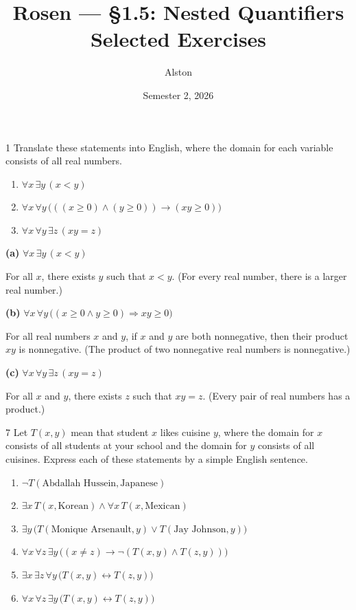 \documentclass[11pt]{article}
\title{Rosen --- \S 1.5: Nested Quantifiers\\ \large Selected Exercises}
\author{Alston}
\date{Semester 2, 2026}
\begin{document}
\maketitle


\begin{exercise}{1}
    Translate these statements into English, where the domain for
    each variable consists of all real numbers.
    \begin{enumerate}[label=(\alph*)]
        \item $\forall x\,\exists y\,(x<y)$
        \item $\forall x\,\forall y\,\big(((x\geq 0)\wedge(y\geq 0))\to(xy\geq 0)\big)$
        \item $\forall x\,\forall y\,\exists z\,(xy=z)$
    \end{enumerate}
\end{exercise}

\begin{solution}
\textbf{(a)} $\forall x\,\exists y\,(x<y)$

For all $x$, there exists $y$ such that $x<y$. (For every real
number, there is a larger real number.)

\bigskip
\noindent\textbf{(b)} $\forall x\,\forall y\,\big((x\geq0\wedge y\geq0)\Rightarrow xy\geq0\big)$

For all real numbers $x$ and $y$, if $x$ and $y$ are both
nonnegative, then their product $xy$ is nonnegative. (The product of
two nonnegative real numbers is nonnegative.)

\bigskip
\noindent\textbf{(c)} $\forall x\,\forall y\,\exists z\,(xy=z)$

For all $x$ and $y$, there exists $z$ such that $xy=z$. (Every pair
of real numbers has a product.)
\end{solution}

\begin{exercise}{7}
    Let $T(x,y)$ mean that student $x$ likes cuisine $y$, where the
    domain for $x$ consists of all students at your school and the
    domain for $y$ consists of all cuisines. Express each of these
    statements by a simple English sentence.
    \begin{enumerate}[label=(\alph*)]
        \item $\neg T(\text{Abdallah Hussein}, \text{Japanese})$
        \item $\exists x\,T(x,\text{Korean})\wedge \forall x\,T(x,\text{Mexican})$
        \item $\exists y\,\big(T(\text{Monique Arsenault}, y)\vee T(\text{Jay Johnson}, y)\big)$
        \item $\forall x\,\forall z\,\exists y\,\big((x\neq z)\to \neg(T(x,y)\wedge T(z,y))\big)$
        \item $\exists x\,\exists z\,\forall y\,\big(T(x,y)\leftrightarrow T(z,y)\big)$
        \item $\forall x\,\forall z\,\exists y\,\big(T(x,y)\leftrightarrow T(z,y)\big)$
    \end{enumerate}
\end{exercise}
\end{document}
